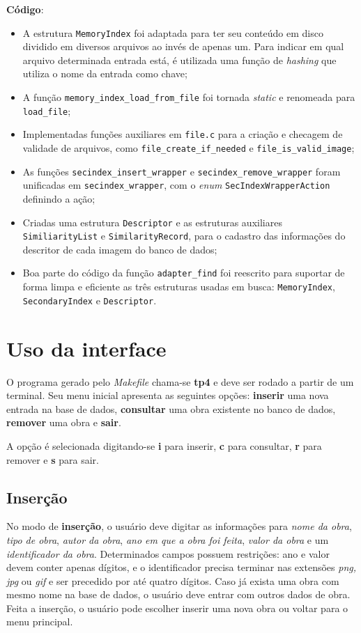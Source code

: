 \documentclass[a4paper,10pt]{article}
\begin{document}
\textbf{Código}:
\begin{itemize}
\item A estrutura \texttt{MemoryIndex} foi adaptada para ter seu conteúdo em disco dividido em diversos arquivos ao invés de apenas um. Para indicar em qual arquivo determinada entrada está, é utilizada uma função de \textit{hashing} que utiliza o nome da entrada como chave;
\item A função \texttt{memory\_index\_load\_from\_file} foi tornada \textit{static} e renomeada para \texttt{load\_file};
\item Implementadas funções auxiliares em \texttt{file.c} para a criação e checagem de validade de arquivos, como \texttt{file\_create\_if\_needed} e \texttt{file\_is\_valid\_image};
\item As funções \texttt{secindex\_insert\_wrapper} e \texttt{secindex\_remove\_wrapper} foram unificadas em \texttt{secindex\_wrapper}, com o \textit{enum} \texttt{SecIndexWrapperAction} definindo a ação;
\item Criadas uma estrutura \texttt{Descriptor} e as estruturas auxiliares \texttt{SimiliarityList} e \texttt{SimilarityRecord}, para o cadastro das informações do descritor de cada imagem do banco de dados;
\item Boa parte do código da função \texttt{adapter\_find} foi reescrito para suportar de forma limpa e eficiente as três estruturas usadas em busca: \texttt{MemoryIndex}, \texttt{SecondaryIndex} e \texttt{Descriptor}.
\end{itemize}

\section{Uso da interface}
O programa gerado pelo \textit{Makefile} chama-se \textbf{tp4} e deve ser rodado a partir de um terminal. Seu menu inicial apresenta as seguintes opções: \textbf{inserir} uma nova entrada na base de dados, \textbf{consultar} uma obra existente no banco de dados, \textbf{remover} uma obra e \textbf{sair}.

A opção é selecionada digitando-se \textbf{i} para inserir, \textbf{c} para consultar, \textbf{r} para remover e \textbf{s} para sair.

\subsection{Inserção}
No modo de \textbf{inserção}, o usuário deve digitar as informações para \textit{nome da obra}, \textit{tipo de obra}, \textit{autor da obra}, \textit{ano em que a obra foi feita}, \textit{valor da obra} e um \textit{identificador da obra}. Determinados campos possuem restrições: ano e valor devem conter apenas dígitos, e o identificador precisa terminar nas extensões \textit{png, jpg} ou \textit{gif} e ser precedido por até quatro dígitos. Caso já exista uma obra com mesmo nome na base de dados, o usuário deve entrar com outros dados de obra. Feita a inserção, o usuário pode escolher inserir uma nova obra ou voltar para o menu principal.
\end{document}
